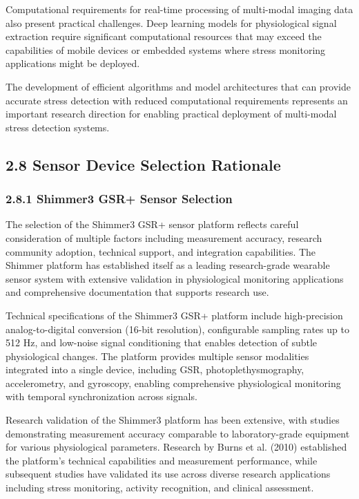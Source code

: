 \documentclass[11pt,a4paper]{article}
\begin{document}
Computational requirements for real-time processing of multi-modal imaging data also present practical challenges. Deep
learning models for physiological signal extraction require significant computational resources that may exceed the
capabilities of mobile devices or embedded systems where stress monitoring applications might be deployed.

The development of efficient algorithms and model architectures that can provide accurate stress detection with reduced
computational requirements represents an important research direction for enabling practical deployment of multi-modal
stress detection systems.

\subsection{2.8 Sensor Device Selection Rationale}

\subsubsection{2.8.1 Shimmer3 GSR+ Sensor Selection}

The selection of the Shimmer3 GSR+ sensor platform reflects careful consideration of multiple factors including
measurement accuracy, research community adoption, technical support, and integration capabilities. The Shimmer platform
has established itself as a leading research-grade wearable sensor system with extensive validation in physiological
monitoring applications and comprehensive documentation that supports research use.

Technical specifications of the Shimmer3 GSR+ platform include high-precision analog-to-digital conversion (16-bit
resolution), configurable sampling rates up to 512 Hz, and low-noise signal conditioning that enables detection of
subtle physiological changes. The platform provides multiple sensor modalities integrated into a single device,
including GSR, photoplethysmography, accelerometry, and gyroscopy, enabling comprehensive physiological monitoring with
temporal synchronization across signals.

Research validation of the Shimmer3 platform has been extensive, with studies demonstrating measurement accuracy
comparable to laboratory-grade equipment for various physiological parameters. Research by Burns et al. (2010)
established the platform's technical capabilities and measurement performance, while subsequent studies have validated
its use across diverse research applications including stress monitoring, activity recognition, and clinical assessment.
\end{document}
